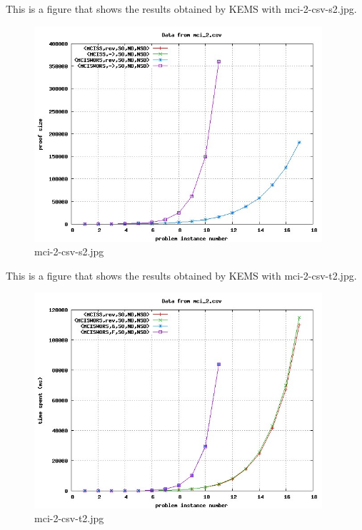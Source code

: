 This is a figure that shows the results obtained by KEMS with mci-2-csv-s2.jpg.
\begin{figure}[htbp]
\begin{center}
\includegraphics[width=0.95\textwidth]{figuras/mci-2-csv-s2.jpg}
\end{center}
\caption{mci-2-csv-s2.jpg}
\end{figure}

This is a figure that shows the results obtained by KEMS with mci-2-csv-t2.jpg.
\begin{figure}[htbp]
\begin{center}
\includegraphics[width=0.95\textwidth]{figuras/mci-2-csv-t2.jpg}
\end{center}
\caption{mci-2-csv-t2.jpg}
\end{figure}

